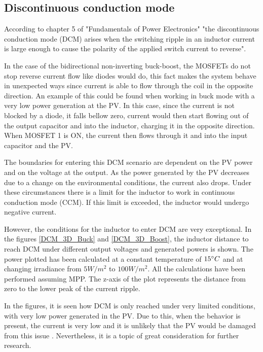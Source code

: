 \subsection{Discontinuous conduction mode}
\label{DCM_Discussion}


According to chapter 5 of "Fundamentals of Power Electronics" \cite{Erickson} "the discontinuous conduction mode (DCM) arises when the switching ripple in an inductor current is large enough to cause the polarity of the applied switch current to reverse". 

In the case of the bidirectional non-inverting buck-boost, the MOSFETs do not stop reverse current flow like diodes would do, this fact makes the system behave in unexpected ways since current is able to flow through the coil in the opposite direction. An example of this could be found when working in buck mode with a very low power generation at the PV. In this case, since the current is not blocked by a diode, it falls bellow zero, current would then start flowing out of the output capacitor and into the inductor, charging it in the opposite direction. When MOSFET 1 is ON, the current then flows through it and into the input capacitor and the PV. 

The boundaries for entering this DCM scenario are dependent on the PV power and on the voltage at the output. As the power generated by the PV decreases due to a change on the environmental conditions, the current also drops. Under these circumstances there is a limit for the inductor to work in continuous conduction mode (CCM). If this limit is exceeded, the inductor would undergo negative current.

However, the conditions for the inductor to enter DCM are very exceptional. In the figures \ref{DCM_3D_Buck} and \ref{DCM_3D_Boost}, the inductor distance to reach DCM under different output voltages and generated powers is shown. The power plotted has been calculated at a constant temperature of $15\dec C$ and at changing irradiance from $5W/m^2$ to $100W/m^2$. All the calculations have been performed assuming MPP.
The z-axis of the plot represents the distance from zero to the lower peak of the current ripple.

In the figures, it is seen how DCM is only reached under very limited conditions, with very low power generated in the PV. Due to this, when the behavior is present, the current is very low and it is unlikely that the PV would be damaged from this issue . Nevertheless, it is a topic of great consideration for further research.

